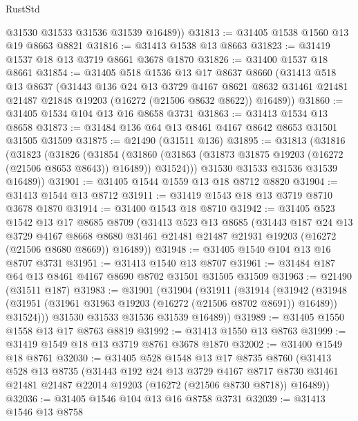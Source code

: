 \begin{lexlean}{RustStd}
\begin{coremodule}
        @31530
        @31533
        @31536
        @31539
        @16489))
@31813 := @31405 @1538 @1560 @13 @19 @8663 @8821
@31816 := @31413 @1538 @13 @8663
@31823 := @31419 @1537 @18 @13 @3719 @8661 @3678 @1870
@31826 := @31400 @1537 @18 @8661
@31854 := @31405
    @518
    @1536
    @13
    @17
    @8637
    @8660
    (@31413
      @518
      @13
      @8637
      (@31443
        @136
        @24
        @13
        @3729
        @4167
        @8621
        @8632
        @31461
        @21481
        @21487
        @21848
        @19203
        (@16272 (@21506 @8632 @8622))
        @16489))
@31860 := @31405 @1534 @104 @13 @16 @8658 @3731
@31863 := @31413 @1534 @13 @8658
@31873 := @31484 @136 @64 @13 @8461 @4167 @8642 @8653 @31501 @31505 @31509
@31875 := @21490 (@31511 @136)
@31895 := @31813
    (@31816
      (@31823
        (@31826
          (@31854
            (@31860 (@31863 (@31873 @31875 @19203 (@16272 (@21506 @8653 @8643)) @16489)) @31524)))
        @31530
        @31533
        @31536
        @31539
        @16489))
@31901 := @31405 @1544 @1559 @13 @18 @8712 @8820
@31904 := @31413 @1544 @13 @8712
@31911 := @31419 @1543 @18 @13 @3719 @8710 @3678 @1870
@31914 := @31400 @1543 @18 @8710
@31942 := @31405
    @523
    @1542
    @13
    @17
    @8685
    @8709
    (@31413
      @523
      @13
      @8685
      (@31443
        @187
        @24
        @13
        @3729
        @4167
        @8668
        @8680
        @31461
        @21481
        @21487
        @21931
        @19203
        (@16272 (@21506 @8680 @8669))
        @16489))
@31948 := @31405 @1540 @104 @13 @16 @8707 @3731
@31951 := @31413 @1540 @13 @8707
@31961 := @31484 @187 @64 @13 @8461 @4167 @8690 @8702 @31501 @31505 @31509
@31963 := @21490 (@31511 @187)
@31983 := @31901
    (@31904
      (@31911
        (@31914
          (@31942
            (@31948 (@31951 (@31961 @31963 @19203 (@16272 (@21506 @8702 @8691)) @16489)) @31524)))
        @31530
        @31533
        @31536
        @31539
        @16489))
@31989 := @31405 @1550 @1558 @13 @17 @8763 @8819
@31992 := @31413 @1550 @13 @8763
@31999 := @31419 @1549 @18 @13 @3719 @8761 @3678 @1870
@32002 := @31400 @1549 @18 @8761
@32030 := @31405
    @528
    @1548
    @13
    @17
    @8735
    @8760
    (@31413
      @528
      @13
      @8735
      (@31443
        @192
        @24
        @13
        @3729
        @4167
        @8717
        @8730
        @31461
        @21481
        @21487
        @22014
        @19203
        (@16272 (@21506 @8730 @8718))
        @16489))
@32036 := @31405 @1546 @104 @13 @16 @8758 @3731
@32039 := @31413 @1546 @13 @8758

\end{coremodule}
\end{lexlean}
